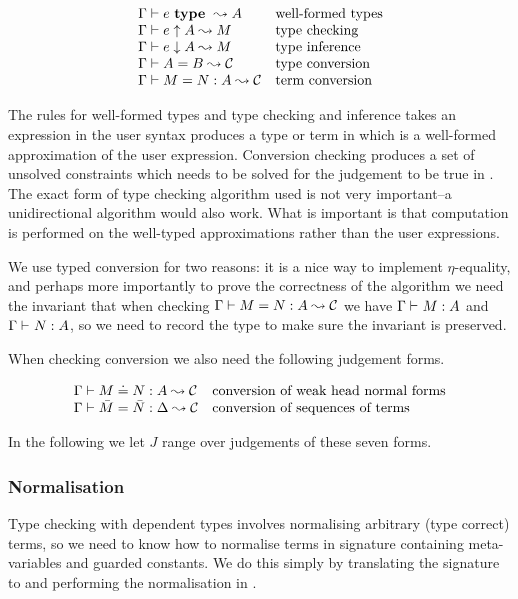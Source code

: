 \[\begin{array}{ll}
    {\Gamma} \vdash {e} ~ \mathbf{type} ~ \leadsto {A} & \mbox{well-formed types} \\
    {\Gamma} \vdash {e} \uparrow {A} \leadsto {M} & \mbox{type checking} \\
    {\Gamma} \vdash {e} \downarrow {A} \leadsto {M} & \mbox{type inference} \\
    {\Gamma} \vdash {A} = {B} \leadsto {\mathcal{C}} & \mbox{type conversion} \\
    {\Gamma} \vdash {M} = {N} : {A} \leadsto {\mathcal{C}} & \mbox{term conversion} \\
\end{array}\]

The rules for well-formed types and type checking and inference takes an
expression in the user syntax produces a type or term in {\Core} which is a
well-formed approximation of the user expression. Conversion checking produces
a set of unsolved constraints which needs to be solved for the judgement to be
true in {\Core}. The exact form of type checking algorithm used is not very
important--a unidirectional algorithm would also work. What is important is
that computation is performed on the well-typed approximations rather than the
user expressions.

We use typed conversion for two reasons: it is a nice way to implement
$\eta$-equality, and perhaps more importantly to prove the correctness of the
algorithm we need the invariant that when checking ${\Gamma} \vdash {M} = {N} : {A} \leadsto {\mathcal{C}}$ we have
${\Gamma} \vdash_{} {M} : {A}$ and ${\Gamma} \vdash_{} {N} : {A}$, so we need to record the
type to make sure the invariant is preserved.

When checking conversion we also need the following judgement forms.

\[\begin{array}{ll}
    {\Gamma} \vdash {M} \doteq {N} : {A} \leadsto {\mathcal{C}} & \mbox{conversion of weak head normal forms} \\
    {\Gamma} \vdash {\bar M} = {\bar N} : {\Delta} \leadsto {\mathcal{C}} & \mbox{conversion of sequences of terms} \\
\end{array}\]

In the following we let $J$ range over judgements of these seven forms.

\subsubsection{Normalisation}

Type checking with dependent types involves normalising arbitrary (type
correct) terms, so we need to know how to normalise terms in signature
containing meta-variables and guarded constants. We do this simply by
translating the signature to {\Core} and performing the normalisation in
{\Core}.

